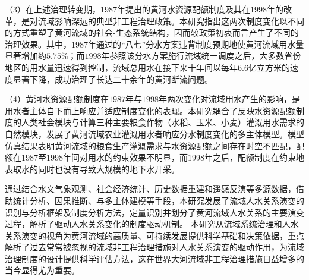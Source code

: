 \begin{cabstract}
（3）在上述治理转变期，$1987$年提出的黄河水资源配额制度及其在$1998$年的改革，是对流域影响深远的典型非工程治理政策。本研究指出这两次制度变化以不同的方式重塑了黄河流域的社会-生态系统结构，因而较政策初衷而言产生了不同的治理效果。其中，$1987$年通过的“八七”分水方案违背制度预期地使黄河流域用水量显著增加约$5.75\%$；而$1998$年参照该分水方案施行流域统一调度之后，大多数省份地区的用水量迅速得到控制，流域总用水在接下来十年间以每年$6.6$亿立方米的速度显著下降，成功治理了长达二十余年的黄河断流问题。

（4）黄河水资源配额制度在$1987$年与$1998$年两次变化对流域用水产生的影响，是用水者主体自下而上响应并适应制度变化的表现。本研究耦合了反映水资源配额制度的人类社会模块与计算三种主要粮食作物（水稻、玉米、小麦）灌溉用水需求的自然模块，发展了黄河流域农业灌溉用水者响应分水制度变化的多主体模型。模型仿真结果表明黄河流域的粮食生产灌溉需求与水资源配额之间存在时空不匹配，配额在$1987$至$1998$年间对用水的约束效果不明显，而$1998$年之后，配额制度在约束地表取水的同时也没有导致大规模的地下水开采。

通过结合水文气象观测、社会经济统计、历史数据重建和遥感反演等多源数据，借助统计分析、因果推断、与多主体建模等手段，本研究发展了流域人水关系演变的识别与分析框架及制度分析方法，定量识别并划分了黄河流域人水关系的主要演变过程，解析了驱动人水关系变化的制度驱动机制。
本研究从流域系统治理和人水关系演变的视角为黄河流域的高质量、可持续发展提供科学基础和决策依据，重点解析了过去常常被忽视的流域非工程治理措施对人水关系演变的驱动作用，为流域治理制度的设计提供科学评估方法，这在世界大河流域非工程治理措施日益增多的当今显得尤为重要。


\end{cabstract}



